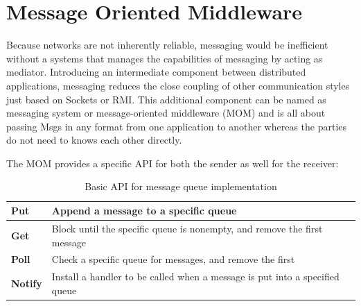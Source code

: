 \begin{enumerate}
{    }
 
\end{enumerate}


\newpage
\section{Message Oriented Middleware}
\label{intro-messaging-mom}
Because networks are not inherently reliable, messaging would be inefficient
without a systems that manages the capabilities of messaging by acting as
mediator. Introducing an intermediate component between distributed applications, messaging
reduces the close coupling of other communication styles just based on
\gls{Socket}s or RMI. This additional component can be named as messaging system
or message-oriented middleware (MOM) and is all about passing \gls{Msg}s in any
format from one application to another whereas the parties do not need to knows
each other directly.   \cite{PprIBMIntro} \cite{TAN06}

The MOM provides a specific API for both the sender as well for the receiver:
\begin{table}[H]
\centering
\begin{tabular}{|l|l|}
\hline
\textbf{Put}    & Append a message to a specific queue                                        \\ \hline
\textbf{Get}    & Block until the specific queue is nonempty, and remove the first message    \\ \hline
\textbf{Poll}   & Check a specific queue for messages, and remove the first                   \\ \hline
\textbf{Notify} & Install a handler to be called when a message is put into a specified queue \\ \hline
\end{tabular}
\caption{Basic API for message queue implementation \cite{TAN06}}
\end{table}

